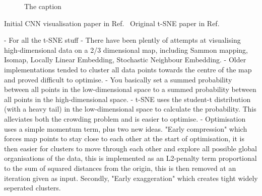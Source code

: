\begin{figure}
{    }
    \quad
    \caption[The caption]
    {The caption}
\end{figure}

Initial CNN visualisation paper in Ref.~\cite{zeiler2013}
Original t-SNE paper in Ref.~\cite{maaten2008}

- For all the t-SNE stuff
- There have been plently of attempts at visualising high-dimensional data on a 2/3 dimensional
map, including Sammon mapping, Isomap, Locally Linear Embedding, Stochastic Neighbour Embedding.
- Older implementations tended to cluster all data points towards the centre of the map and proved
difficult to optimise.
- You basically set a summed probability between all points in the low-dimensional space to a
summed probability between all points in the high-dimensional space.
- t-SNE uses the student-t distribution (with a heavy tail) in the low-dimensional space to
calculate the probability. This alleviates both the crowding problem and is easier to optimise.
- Optimisation uses a simple momentum term, plus two new ideas. "Early compression" which forces
map points to stay close to each other at the start of optimisation, it is then easier for
clusters to move through each other and explore all possible global organisations of the data,
this is implemented as an L2-penalty term proportional to the sum of squared distances from the
origin, this is then removed at an iteration given as input. Secondly, "Early exaggeration" which
creates tight widely seperated clusters.

